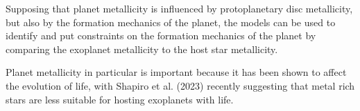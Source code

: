 \documentclass[a4paper,twocolumn,12pt]{article}
\begin{document}
Supposing that planet metallicity is influenced by protoplanetary disc metallicity, but also by the formation mechanics of the planet, the models can be used to identify and put constraints on the formation mechanics of the planet by comparing the exoplanet metallicity to the host star metallicity. %





Planet metallicity in particular is important because it has been shown to affect the evolution of life, with Shapiro et al. (2023) \cite{Shapiro} recently suggesting that metal rich stars are less suitable for hosting exoplanets with life.
\end{document}
